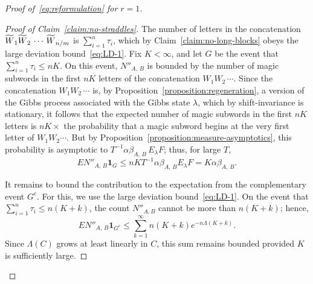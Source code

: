 \documentclass[10pt]{amsart}
\theoremstyle{definition}\newtheorem{defi}[theo]{Definition}\newtheorem{rema}[theo]{Remark}\newtheorem{exam}[theo]{Example}\newtheorem{exem}[theo]{Example}\newtheorem{nota}[theo]{Notation}
\let\oldtilde\tilde
\renewcommand*{\tilde}[1]{\mathchoice{\widetilde{#1}}{\widetilde{#1}}{\oldtilde{#1}}{\oldtilde{#1}}}\let\oldforall\forall
\renewcommand*{\forall}{\mathrel{\oldforall}}
\begin{document}
\begin{proof}[Proof of~\eqref{eq:reformulation} for $r= 1$]
\begin{proof}[Proof of Claim~\ref{claim:no-straddles}]
The number of letters in the concatenation $\tilde{W}_{1}\tilde{W}_{2}\,\dotsb\,\tilde{W}_{n/m}$ is $\sum_{i=1}^{n}\tau_{i}$, which by Claim~\ref{claim:no-long-blocks} obeys the large deviation bound~\eqref{eq:LD-1}. Fix $K<\infty$, and let $G$ be the event that $\sum_{i=1}^{n}\tau_{i} \leq nK$. On this event, $N''_{A,\,B}$ is bounded by the number of magic subwords in the first $nK$ letters of the concatenation $W_{1}W_{2}\,\dotsb$. Since the concatenation $W_{1}W_{2}\,\dotsb $ is, by Proposition~\ref{proposition:regeneration}, a version of the Gibbs process associated with the Gibbs state $\lambda$, which by shift-invariance is stationary, it follows that the expected number of magic subwords in the first $nK$ letters is $nK \times $ the probability that a magic subword begins at the very first letter of $W_{1}W_{2}\dotsb $. But by Proposition~\ref{proposition:measure-asymptotics}, this probability is asymptotic to $ T^{-1}\alpha \beta_{A,\,B}\,E_{\lambda} F$; thus, for large $T$,
\begin{equation*}
EN''_{A,\,B}\mathbf{1}_{G}\leq nKT^{-1}\alpha
\beta_{A,\,B}E_{\lambda}F =K\alpha \beta_{A,\,B}.
\end{equation*}

It remains to bound the contribution to the expectation from the complementary event $G^{c}$. For this, we use the large deviation bound~\eqref{eq:LD-1}. On the event that $\sum_{i=1}^{n}\tau_{i} \leq n (K+k)$, the count $N''_{A,B}$ cannot be more than $n (K+k)$; hence,
\[
EN''_{A,\,B}\mathbf{1}_{G^{c}}\leq \sum_{k=1}^{\infty} n (K+k) e^{-n\Lambda (K+k)}.
\]
Since $\Lambda (C)$ grows at least linearly in $C$, this sum remains bounded provided $K$ is sufficiently large.
\end{proof}


\end{proof}
\end{document}
